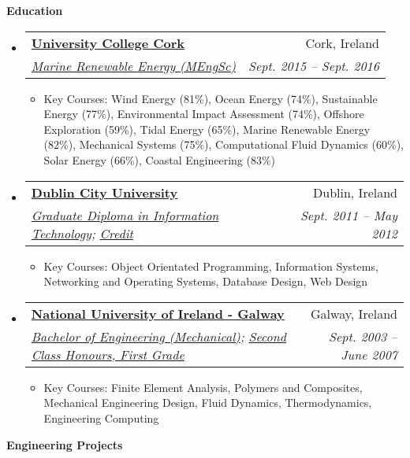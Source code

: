 \documentclass[letterpaper,11pt]{article}
\makeatletter
\newcommand{\resitem}[1]{\item #1 \vspace{-2pt}}
\newcommand{\resheading}[1]{{\large \colorbox{mygrey}{\begin{minipage}{\textwidth}{\textbf{#1 \vphantom{p\^{E}}}}\end{minipage}}}}
\newcommand{\ressubheading}[4]{
\begin{tabular*}{6.5in}{l@{\extracolsep{\fill}}r}
		\textbf{#1} & #2 \\
		\textit{#3} & \textit{#4} \\
\end{tabular*}\vspace{-6pt}}
\makeatother
\begin{document}
\resheading{Education}
	\begin{itemize}
    \item
      \ressubheading{\href{http://www.ucc.ie}{University College Cork}}{Cork, Ireland}{\href{http://www.ucc.ie/en/ckr51/}{Marine Renewable Energy (MEngSc)}}
      {Sept. 2015 -- Sept. 2016}
        { \footnotesize
        \begin{itemize}
        \resitem{Key Courses: Wind Energy (81\%), Ocean Energy (74\%), Sustainable Energy (77\%), Environmental Impact Assessment (74\%), Offshore Exploration (59\%), Tidal Energy (65\%), Marine Renewable Energy (82\%), Mechanical Systems (75\%), Computational Fluid Dynamics (60\%), Solar Energy (66\%), Coastal Engineering (83\%)}
        \end{itemize}
        }

    \item
      \ressubheading{\href{http://www.dcu.ie}{Dublin City University}}{Dublin, Ireland}{\href{https://www.dcu.ie/prospective/deginfo.php?classname=GDF\&originating_school=40}{Graduate Diploma in Information Technology};
      \href{http://peterarmstrong.ie/cv/grad_dip_it_transcript.pdf}{Credit}}
      {Sept. 2011 -- May 2012}
        { \footnotesize
        \begin{itemize}
        \resitem{Key Courses: Object Orientated Programming, Information Systems, Networking and Operating Systems, Database Design, Web Design}
        \end{itemize}
        }

		\item
			\ressubheading{\href{http://www.nuigalway.ie}{National University of Ireland - Galway}}{Galway, Ireland}
			{\href{http://www.nuigalway.ie/courses/undergraduate-courses/mechanical-engineering.html}{Bachelor of Engineering (Mechanical)}; 
			\href{http://peterarmstrong.ie/cv/mech_eng_transcript.jpg}{Second Class Honours, First Grade}}
      {Sept. 2003 -- June 2007}
				{ \footnotesize
				\begin{itemize}
					\resitem{Key Courses: Finite Element Analysis, Polymers and Composites, Mechanical Engineering Design, Fluid Dynamics, Thermodynamics, Engineering Computing }
				\end{itemize}
				}

	\end{itemize} %

\resheading{Engineering Projects}
\end{document}
